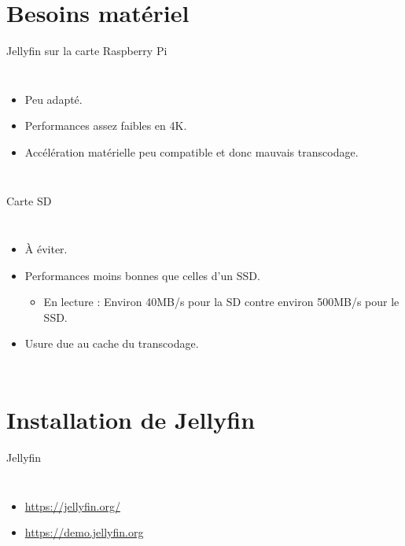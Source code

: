 \documentclass[aspectratio=169,xcolor=dvipsnames]{beamer}
\begin{document}
\section{Besoins matériel}

\begin{frame}{Jellyfin sur la carte Raspberry Pi}
    \begin{columns}[c] %

        \begin{itemize}
            \item Peu adapté.
            \item Performances assez faibles en 4K.
            \item Accélération matérielle peu compatible et donc mauvais transcodage.
        \end{itemize}

    \end{columns}
\end{frame}

\begin{frame}{Carte SD}
    \begin{columns}[c] %

        \begin{itemize}
            \item À éviter.
            \item Performances moins bonnes que celles d'un SSD.
            \begin{itemize}
                \item En lecture : Environ 40MB/s pour la SD contre environ 500MB/s pour le SSD.
            \end{itemize}
            \item Usure due au cache du transcodage.
        \end{itemize}

    \end{columns}
\end{frame}

\section{Installation de Jellyfin}

\begin{frame}{Jellyfin}
    \begin{columns}[c] %

        \begin{itemize}
            \item \url{https://jellyfin.org/}
            \item \url{https://demo.jellyfin.org}
        \end{itemize}

    \end{columns}
\end{frame}
\end{document}
